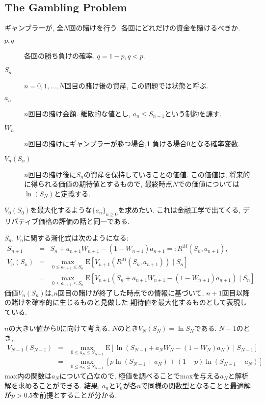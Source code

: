 \documentclass[11pt]{jsbook}
\begin{document}
\subsection{The Gambling Problem}
ギャンブラーが, 全$N$回の賭けを行う. 各回にどれだけの資金を賭けるべきか.
\begin{description}
	\item[$p,q$] 各回の勝ち負けの確率. $q=1-p, q<p$.
	\item[$S_n$] $n=0,1,\dots,N$回目の賭け後の資産, この問題では状態と呼ぶ.
	\item[$a_n$] $n$回目の賭け金額. 離散的な値とし, $a_n \le S_{n-1}$という制約を課す.
	\item[$W_n$] $n$回目の賭けにギャンブラーが勝つ場合,1 負ける場合0となる確率変数.
	\item[$V_n(S_n)$] $n$回目の賭け後に$S_n$の資産を保持していることの価値. 
	                  この価値は, 将来的に得られる価値の期待値とするもので, 
	                  最終時点$N$での価値については$\ln (S_N)$と定義する.
\end{description}
$V_0(S_0)$を最大化するような$\{a_n\}_{n\ge 0}$を求めたい.
これは金融工学で出てくる, デリバティブ価格の評価の話と同一である.

$S_n$, $V_n$に関する漸化式は次のようになる:
\begin{eqnarray}
  S_{n+1} &=& S_n + a_{n+1} W_{n+1} - (1 - W_{n+1}) a_{n+1} =: R^M(S_n, a_{n+1}),\\
  V_{n}(S_n) &=& \max_{0 \le a_{n+1} \le S_n} \mathrm{E} \left[ V_{n+1}(R^M(S_n, a_{n+1})) \mid S_n \right]\\
  			 &=& \max_{0 \le a_{n+1} \le S_n} \mathrm{E} \left[ V_{n+1} \left( S_n + a_{n+1} W_{n+1} - (1 - W_{n+1}) a_{n+1} \right) \mid S_n \right]
\end{eqnarray}
価値$V_n(S_n)$は,$n$回目の賭けが終了した時点での情報に基づいて, $n+1$回目以降の賭けを確率的に生じるものと見做した
期待値を最大化するものとして表現している.

$n$の大きい値から$0$に向けて考える. $N$のとき$V_N(S_N) = \ln S_N$である. $N-1$のとき,
\begin{eqnarray}
  V_{N-1}(S_{N-1}) 
  &=& \max_{0 \le a_{N} \le S_{N-1}} \mathrm{E} 
  	  \left[ \ln \left( S_{N-1} + a_{N} W_{N} - (1 - W_{N}) a_{N} \right) \mid S_{N-1} \right]\\
  &=& \max_{0 \le a_{N} \le S_{N-1}} 
  	  \left[ p \ln \left( S_{N-1} + a_{N} \right) + (1-p) \ln \left( S_{N-1} - a_{N} \right) \right]
\end{eqnarray}
max内の関数は$a_{N}$について凸なので, 極値を調べることでmaxを与える$a_N$と解析解を求めることができる.
結果, $a_n$と$V_n$が各$n$で同様の関数型となることと最適解が$p>0.5$を前提とすることが分かる.
\end{document}
